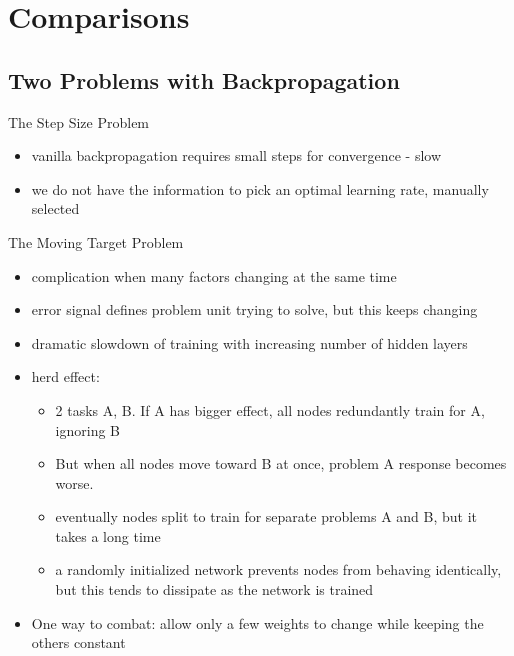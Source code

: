 \documentclass[presentation]{beamer}
\begin{document}
\section{Comparisons}
\label{sec:org8f2bd35}
\subsection{Two Problems with Backpropagation}
\label{sec:org168fc30}
\begin{frame}[label={sec:org200ccae}]{The Step Size Problem}
\begin{itemize}
\item vanilla backpropagation requires small steps for convergence - slow
\item we do not have the information to pick an optimal learning rate, manually selected
\end{itemize}
\end{frame}
\begin{frame}[label={sec:orgde08e3c}]{The Moving Target Problem}
\begin{itemize}
\item complication when many factors changing at the same time
\item error signal defines problem unit trying to solve, but this keeps changing
\item dramatic slowdown of training with increasing number of hidden layers
\item herd effect:
\begin{itemize}
\item 2 tasks A, B. If A has bigger effect, all nodes redundantly train for A, ignoring B
\item But when all nodes move toward B at once, problem A response becomes worse.
\item eventually nodes split to train for separate problems A and B, but it takes a long time
\item a randomly initialized network prevents nodes from behaving identically, but this tends to dissipate as the network is trained
\end{itemize}
\item One way to combat: allow only a few weights to change while keeping the others constant
\end{itemize}
\end{frame}
\end{document}
